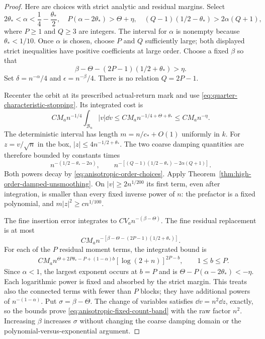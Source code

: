 \begin{proof}
Here are choices with strict analytic and residual margins. Select
\begin{equation}\label{eq:anisotropic-order-choices}
 2\theta_*<\alpha<\frac14-\frac{\theta_*}{2},\quad
 P(\alpha-2\theta_*)>\Theta+\eta,\quad
 (Q-1)(1/2-\theta_*)>2\alpha(Q+1),
\end{equation}
where $P\ge1$ and $Q\ge3$ are integers. The interval for $\alpha$
is nonempty because $\theta_*<1/10$. Once $\alpha$ is chosen,
choose $P$ and $Q$ sufficiently large; both displayed strict
inequalities have positive coefficients at large order. Choose a
fixed $\beta$ so that
\begin{equation}\label{eq:anisotropic-fine-choice}
 \beta-\Theta-(2P-1)(1/2+\theta_*)>\eta.
\end{equation}
Set $\delta=n^{-\alpha}/4$ and $\epsilon=n^{-\beta}/4$.
There is no relation $Q=2P-1$.

Recenter the orbit at its prescribed actual-return mark and use
\eqref{eq:quarter-characteristic-stopping}. Its integrated cost is
\begin{equation}\label{eq:anisotropic-stopping-integral}
 CM_an^{-1/4}\int_{\mathcal B_n}|v|\dd v
       \le CM_an^{-1/4+\Theta+\theta_*}\le CM_an^{-\eta}.
\end{equation}
The deterministic interval has length $m=n/c_*+O(1)$ uniformly in
$k$. For $z=v/\sqrt n$ in the box, $|z|\le4n^{-1/2+\theta_*}$.
The two coarse damping quantities are therefore bounded by constants
times
\[
 n^{-(1/2-\theta_*-2\alpha)},\qquad
 n^{-[(Q-1)(1/2-\theta_*)-2\alpha(Q+1)]}.
\]
Both powers decay by \eqref{eq:anisotropic-order-choices}.
Apply Theorem~\ref{thm:high-order-damped-unsmoothing}.
On $|v|\ge2n^{1/200}$ its first term, even after integration, is
smaller than every fixed inverse power of $n$: the prefactor is a
fixed polynomial, and $m|z|^2\ge c n^{1/100}$.

The fine insertion error integrates to $CV_an^{-(\beta-\Theta)}$.
The fine residual replacement is at most
\[
 CM_an^{-[\beta-\Theta-(2P-1)(1/2+\theta_*)]}.
\]
For each of the $P$ residual moment terms, the integrated bound is
\begin{align}
 &CM_an^{\Theta+2P\theta_*-P+(1-\alpha)b}
                       [\log(2+n)]^{2P-b},\qquad 1\le b\le P.
 \label{eq:anisotropic-residual-powers}
\end{align}
Since $\alpha<1$, the largest exponent occurs at $b=P$ and is
$\Theta-P(\alpha-2\theta_*)<-\eta$. Each logarithmic power is
fixed and absorbed by the strict margin. This treats also the
connected terms with fewer than $P$ blocks; they have additional
powers of $n^{-(1-\alpha)}$. Put $\sigma=\beta-\Theta$.
The change of variables satisfies $\dd v=n^2\dd z$, exactly, so the
bounds prove \eqref{eq:anisotropic-fixed-count-band} with the raw
factor $n^2$. Increasing $\beta$ increases $\sigma$ without changing
the coarse damping domain or the polynomial-versus-exponential argument.


\end{proof}
